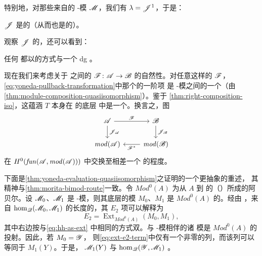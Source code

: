 特别地，对那些来自\trYonedaEmbedding{}的 \trAinfty-模 $\mathscr{M}$，我们有
$\lambda=\mathscr{J}^1$，于是：

\begin{corollary}\label{thm:yoneda-cohomologically-full-faithful}
$\mathscr{J}$ 是\trCohomology\trFullyFaithful{}的（从而也是\trCunital{}的）。
\noqed
\end{corollary}

观察 $\mathscr{J}$ 的\trImage，还可以看到：

\begin{corollary}\label{thm:cunital-quasiisomorphic-strictly-unital}
任何 \trCunital{} \trACategory{}都以\trCanonical{}的方式与一个\trStrictlyUnital{} dg
\trCategory{}\trQuasiisomorphism{}。
\noqed
\end{corollary}

现在我们来考虑\trYonedaEmbedding{}关于 \trCunital{} \trACategory{}之间的%
\trCohomology\trFullyFaithful{} \trAFunctor{} $\mathscr{F}\colon\mathscr{A}\to\mathscr{B}$
的自然性。对任意这样的\trFunctor{} $\mathscr{F}$，
\eqref{eq:yoneda-pullback-transformation}中那个\trNaturalTransformation{}的一阶项
是 \trCunital{} \trAinfty-模之间的一个\trIsomorphism（由%
\cref{thm:module-composition-quasiisomorphism}）。鉴于%
\cref{thm:right-composition-iso}，这蕴涵 $T$ 本身在 \trAFunctor{}的底层%
\trCohomology{}\trCategory{}中是一个\trIsomorphism。换言之，图
\begin{equation}\label{eq:yoneda-naturality-diagram}
\begin{tikzcd}
\scr{A}\ar[r,"\scr{F}"]\ar[d,"\scr{J}_{\scr{A}}"] & \scr{B}\ar[d,"\scr{J}_{\scr{B}}"]\\
\mathit{mod}(\scr{A}) & \mathit{mod}(\scr{B})\ar[l,"\scr{F}^*"]
\end{tikzcd}
\end{equation}
在 $H^0(\mathit{fun}(\mathscr{A},\mathit{mod}(\mathscr{A})))$ 中交换至相差一个%
\trCanonical{}\trIsomorphism{}的程度。

\begin{remark}\label{thm:yoneda-ext-interpretation}
下面是\cref{thm:yoneda-evaluation-quasiisomorphism}之证明的一个更抽象的重述，
其精神与\cref{thm:morita-bimod-route}一致。令 $\mathit{Mod}^0(A)$ 为从 $A$ 到\trGraded\trVectorSpace{}%
的\trContravariant{}（\trUnital{}）\trFunctor{}所成的阿贝尔\trCategory。设
$\mathscr{M}_0$、$\mathscr{M}_1$ 是 \trCunital{} \trAinfty-模，则其底层的\trCohomology{}模
$M_0$、$M_1$ 是 $\mathit{Mod}^0(A)$ 的\trObject。经由 \trBarResolution，来自
$\hom_{\mathscr{Q}}(\mathscr{M}_0,\mathscr{M}_1)$ 的长度\trFiltration{}的\trSpectralSequence{}，其 $E_2$
项可以解释为
\begin{equation}\label{eq:ext-e2-term}
E_2=\operatorname{Ext}_{\mathit{Mod}^0(A)}(M_0,M_1),
\end{equation}
其中右边按与\eqref{eq:hh-as-ext} 中相同的方式双\trGraded。与\trYoneda{} \trAinfty-模相伴的诸%
\trCohomology{}模是 $\mathit{Mod}^0(A)$ 的投射\trObject。因此，若 $M_0=\mathscr{Y}$，
则\eqref{eq:ext-e2-term}中仅有一个非零的列，而该列可以等同于 $M_1(Y)$。于是，
$\mathscr{M}_1(Y)$ 与 $\hom_{\mathscr{Q}}(\mathscr{Y},\mathscr{M}_1)$ \trQuasiisomorphism。
\end{remark}
